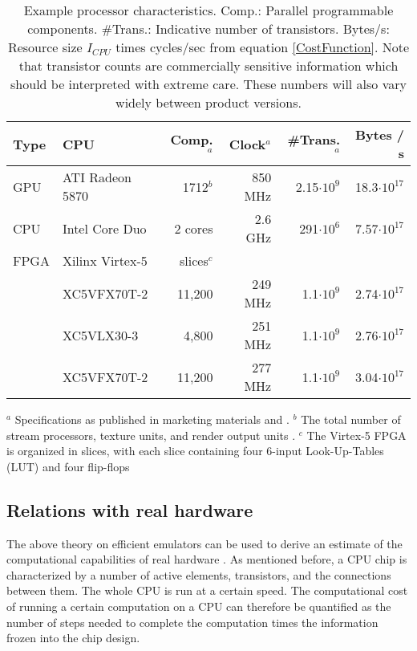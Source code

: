 \documentclass{article}
\begin{document}
\begin{table}
\caption{Example processor characteristics.
Comp.: Parallel programmable components. \#Trans.: Indicative number of transistors.
Bytes/s: Resource size $I_{CPU}$ times cycles/sec from equation 
\ref{CostFunction}. Note that transistor counts are commercially sensitive
information which should be interpreted with extreme care. These numbers will also vary
widely between product versions.} 
\begin{tabular}{llrrrr}
Type &CPU & Comp.$^a$& Clock$^a$ & \#Trans.$^a$ & Bytes / s\\
\hline
GPU & ATI Radeon 5870 & 1712$^b$ & 850 MHz& 2.15$\cdot 10^9$ & 18.3$\cdot 10^{17}$\\
CPU & Intel Core Duo & 2 cores& 2.6 GHz & 291$\cdot 10^6$ & 7.57$\cdot 10^{17}$\\
FPGA & Xilinx Virtex-5 &  slices$^c$& &  &\\
 &\hfill{\footnotesize XC5VFX70T-2} & 11,200 &  249 MHz& 1.1$\cdot 10^9$ & 2.74$\cdot 10^{17}$\\
 &\hfill{\footnotesize XC5VLX30-3} & 4,800 &  251 MHz& 1.1$\cdot 10^9$ & 2.76$\cdot 10^{17}$\\
 &\hfill{\footnotesize XC5VFX70T-2} & 11,200&  277 MHz& 1.1$\cdot 10^9$ & 3.04$\cdot 10^{17}$\\
\end{tabular}\newline
{\footnotesize $^a$ Specifications as published in marketing materials and 
\cite{WikipediaCoreDuo,WikipediaTransistorCount,LoydCase2009}.
$^b$ The total number of stream processors, texture units, and render output units
\cite{LoydCase2009}.
$^c$ The Virtex-5 FPGA is organized in slices, with each slice containing four 6-input 
Look-Up-Tables (LUT) and four flip-flops \cite{NationalInstrumentsVirtex5,specification-virtex}}
\label{TabChipChars}
\end{table}

\begin{comment}
GPU:  850*10^6 * 2.15*10^9
CPU:  2.6*10^9 * 291*10^6
XC5VFX70T-2: 249.4 * 10^6 * 1.1*10^9
XC5VLX30-3  : 251 * 10^6 * 1.1*10^9
XC5VFX70T-2: 276.7*10^6 * 1.1*10^9
\end{comment}

\subsection{Relations with real hardware}\label{RealHardware}

The above theory on efficient emulators can be used to derive an estimate
of the computational capabilities of real hardware \cite{Son0911-5262}. 
As mentioned before, a CPU chip is characterized by a number of active
elements, transistors, and the connections between them. The whole CPU is 
run at a certain speed. The computational cost of running a certain 
computation on a CPU can therefore  be quantified as the number of steps
needed to complete the computation times the information frozen into the
chip design.
\end{document}
